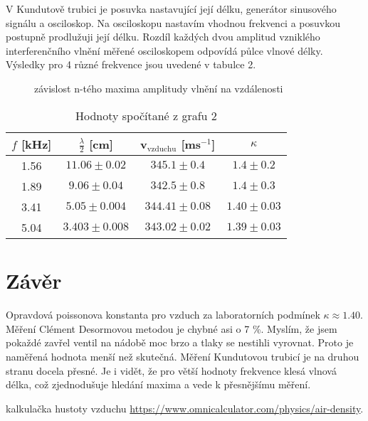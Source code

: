 \documentclass[a4paper,11pt]{article}
\begin{document}
V Kundutově trubici je posuvka nastavující její délku, generátor sinusového signálu a osciloskop. Na osciloskopu nastavím vhodnou frekvenci a posuvkou postupně prodlužuji její délku. Rozdíl každých dvou amplitud vzniklého interferenčního vlnění měřené osciloskopem odpovídá půlce vlnové délky. Výsledky pro 4 různé frekvence jsou uvedené v tabulce 2.

\begin{figure}[htpb]
  \centering
  
  \caption{závislost n-tého maxima amplitudy vlnění na vzdálenosti}
\end{figure}

\begin{table}[ht]
  \centering
  \begin{tabular}{| c | c | c | c |}
    \hline
    $f$ [kHz] & $\frac{\lambda }{2}$ [cm] & v$_\text{vzduchu}$ [ms$^{-1}$] & $\kappa$ \\ \hline
    1.56 & $11.06 \pm 0.02$  & $345.1 \pm 0.4$ & $1.4 \pm 0.2$ \\
    1.89 & $9.06  \pm 0.04$  & $342.5 \pm 0.8$ & $1.4 \pm 0.3 $\\
    3.41 & $5.05 \pm 0.004$  & $344.41 \pm 0.08$ & $1.40 \pm 0.03$ \\
    5.04 & $3.403 \pm 0.008$ & $343.02 \pm 0.02$ & $1.39 \pm 0.03$ \\ \hline
  \end{tabular}
  \caption{Hodnoty spočítané z grafu 2}
\end{table}

\section{Závěr}

Opravdová poissonova konstanta pro vzduch za laboratorních podmínek $\kappa \approx 1.40.$ \\

 Měření Clément Desormovou metodou je chybné asi o 7 \%. Myslím, že jsem pokaždé zavřel ventil na nádobě moc brzo a tlaky se nestihli vyrovnat.
Proto je naměřená hodnota menší než skutečná. Měření Kundutovou trubicí je na druhou stranu docela přesné. 
Je i vidět, že pro větší hodnoty frekvence klesá vlnová délka, což zjednodušuje hledání maxima a vede k přesnějšímu měření.


\begin{thebibliography}{0}
 kalkulačka hustoty vzduchu \url{https://www.omnicalculator.com/physics/air-density}.
\end{thebibliography}
\end{document}
